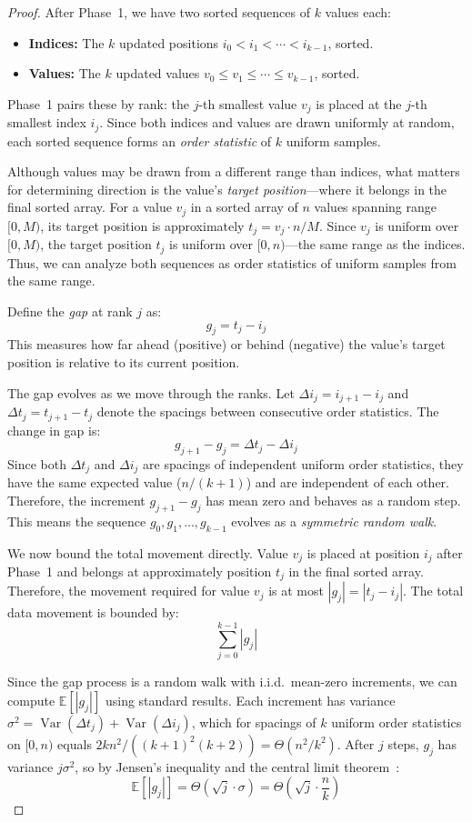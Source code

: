\begin{proof}
After Phase~1, we have two sorted sequences of $k$ values each:
\begin{itemize}
  \item \textbf{Indices:} The $k$ updated positions $i_0 < i_1 < \cdots < i_{k-1}$, sorted.
  \item \textbf{Values:} The $k$ updated values $v_0 \le v_1 \le \cdots \le v_{k-1}$, sorted.
\end{itemize}
Phase~1 pairs these by rank: the $j$-th smallest value $v_j$ is placed at the $j$-th smallest index $i_j$. Since both indices and values are drawn uniformly at random, each sorted sequence forms an \emph{order statistic} of $k$ uniform samples.

Although values may be drawn from a different range than indices, what matters for determining direction is the value's \emph{target position}---where it belongs in the final sorted array. For a value $v_j$ in a sorted array of $n$ values spanning range $[0, M)$, its target position is approximately $t_j = v_j \cdot n / M$. Since $v_j$ is uniform over $[0, M)$, the target position $t_j$ is uniform over $[0, n)$---the same range as the indices. Thus, we can analyze both sequences as order statistics of uniform samples from the same range.

Define the \emph{gap} at rank $j$ as:
\[
g_j = t_j - i_j
\]
This measures how far ahead (positive) or behind (negative) the value's target position is relative to its current position.

The gap evolves as we move through the ranks. Let $\Delta i_j = i_{j+1} - i_j$ and $\Delta t_j = t_{j+1} - t_j$ denote the spacings between consecutive order statistics. The change in gap is:
\[
g_{j+1} - g_j = \Delta t_j - \Delta i_j
\]
Since both $\Delta t_j$ and $\Delta i_j$ are spacings of independent uniform order statistics, they have the same expected value ($n/(k+1)$) and are independent of each other. Therefore, the increment $g_{j+1} - g_j$ has mean zero and behaves as a random step. This means the sequence $g_0, g_1, \ldots, g_{k-1}$ evolves as a \emph{symmetric random walk}.

We now bound the total movement directly. Value $v_j$ is placed at position $i_j$ after Phase~1 and belongs at approximately position $t_j$ in the final sorted array. Therefore, the movement required for value $v_j$ is at most $|g_j| = |t_j - i_j|$. The total data movement is bounded by:
\[
\sum_{j=0}^{k-1} |g_j|
\]

Since the gap process is a random walk with i.i.d.\ mean-zero increments, we can compute $\mathbb{E}[|g_j|]$ using standard results. Each increment has variance $\sigma^2 = \operatorname{Var}(\Delta t_j) + \operatorname{Var}(\Delta i_j)$, which for spacings of $k$ uniform order statistics on $[0, n)$ equals $2kn^2 / ((k+1)^2(k+2)) = \Theta(n^2/k^2)$. After $j$ steps, $g_j$ has variance $j\sigma^2$, so by Jensen's inequality and the central limit theorem~\cite{feller1968}:
\[
\mathbb{E}[|g_j|] = \Theta(\sqrt{j} \cdot \sigma) = \Theta\!\left(\sqrt{j} \cdot \frac{n}{k}\right)
\]


\end{proof}
